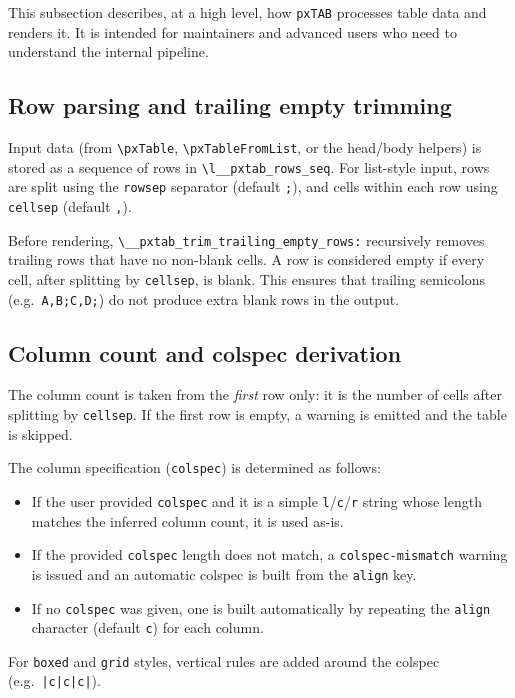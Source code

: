 \documentclass[11pt,a4paper]{article}
\begin{document}
This subsection describes, at a high level, how \texttt{pxTAB} processes
table data and renders it.  It is intended for maintainers and advanced
users who need to understand the internal pipeline.

\subsection*{Row parsing and trailing empty trimming}

Input data (from \verb|\pxTable|, \verb|\pxTableFromList|, or the
head/body helpers) is stored as a sequence of rows in
\verb|\l__pxtab_rows_seq|.  For list-style input, rows are split using
the \texttt{rowsep} separator (default \texttt{;}), and cells within each
row using \texttt{cellsep} (default \texttt{,}).

Before rendering, \verb|\__pxtab_trim_trailing_empty_rows:| recursively
removes trailing rows that have no non-blank cells.  A row is considered
empty if every cell, after splitting by \texttt{cellsep}, is blank.
This ensures that trailing semicolons (e.g.\ \texttt{A,B;C,D;}) do not
produce extra blank rows in the output.

\subsection*{Column count and colspec derivation}

The column count is taken from the \emph{first} row only: it is the
number of cells after splitting by \texttt{cellsep}.  If the first row
is empty, a warning is emitted and the table is skipped.

The column specification (\texttt{colspec}) is determined as follows:
\begin{itemize}
  \item If the user provided \texttt{colspec} and it is a simple
    \texttt{l}/\texttt{c}/\texttt{r} string whose length matches the
    inferred column count, it is used as-is.
  \item If the provided \texttt{colspec} length does not match, a
    \texttt{colspec-mismatch} warning is issued and an automatic
    colspec is built from the \texttt{align} key.
  \item If no \texttt{colspec} was given, one is built automatically
    by repeating the \texttt{align} character (default \texttt{c}) for
    each column.
\end{itemize}

For \texttt{boxed} and \texttt{grid} styles, vertical rules are added
around the colspec (e.g.\ \texttt{|c|c|c|}).
\end{document}
